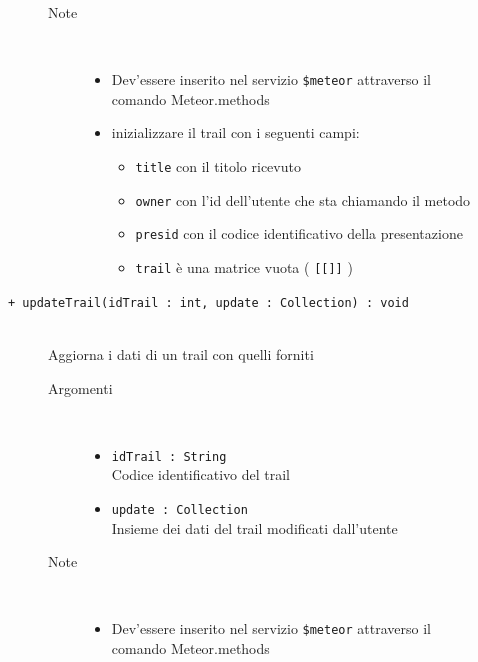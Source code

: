 \begin{description}
\begin{description}
\begin{description}
\begin{itemize}
				\end{itemize}
			\item[Note] \hfill \\
			\begin{itemize}
					\item Dev'essere inserito nel servizio \texttt{\$meteor} attraverso il comando Meteor.methods
					\item inizializzare il trail con i seguenti campi:
					\begin{itemize}
					\item \texttt{title} con il titolo ricevuto
					\item \texttt{owner} con l'id dell'utente che sta chiamando il metodo
					\item \texttt{presid} con il codice identificativo della presentazione
					\item \texttt{trail} è una matrice vuota ( \texttt{[[]]} )
					\end{itemize}
				\end{itemize}
		\end{description}
	\end{description}
	
	\begin{description}
		\item[\texttt{+ updateTrail(idTrail : int, update : Collection) : void			}] \hfill \\
			Aggiorna i dati di un trail con quelli forniti
			
		\begin{description}
			\item[Argomenti] \hfill \\
				\begin{itemize}
				
					\item \texttt{idTrail : String		} \hfill \\
					Codice identificativo del trail
					\item \texttt{update : Collection		} \hfill \\
					Insieme dei dati del trail modificati dall'utente
					
				\end{itemize}
			\item[Note] \hfill \\
			\begin{itemize}
					\item Dev'essere inserito nel servizio \texttt{\$meteor} attraverso il comando Meteor.methods
				\end{itemize}
		\end{description}
	\end{description}
	

\end{description}
